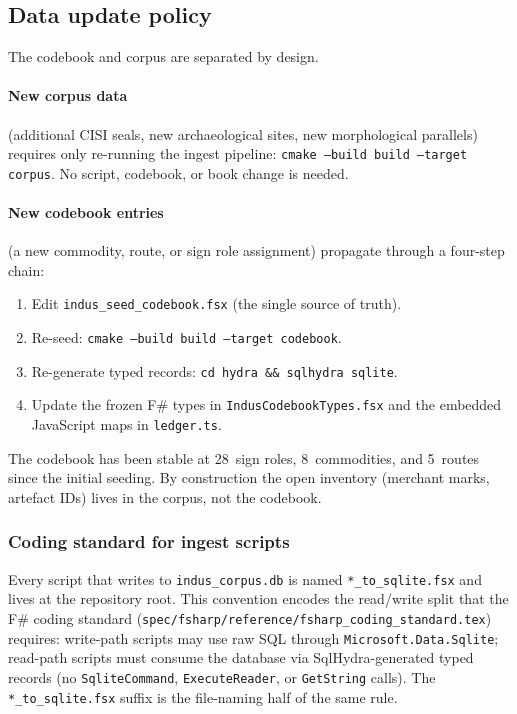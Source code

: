 \subsection{Data update policy}

The codebook and corpus are separated by design.

\paragraph{New corpus data} (additional CISI seals, new
archaeological sites, new morphological parallels) requires only
re-running the ingest pipeline:
\texttt{cmake --build build --target corpus}.
No script, codebook, or book change is needed.

\paragraph{New codebook entries} (a new commodity, route, or sign
role assignment) propagate through a four-step chain:
\begin{enumerate}[nosep]
\item Edit \texttt{indus\_seed\_codebook.fsx} (the single source
  of truth).
\item Re-seed: \texttt{cmake --build build --target codebook}.
\item Re-generate typed records: \texttt{cd hydra \&\& sqlhydra
  sqlite}.
\item Update the frozen F\# types in
  \texttt{IndusCodebookTypes.fsx} and the embedded JavaScript maps
  in \texttt{ledger.ts}.
\end{enumerate}
The codebook has been stable at 28~sign roles, 8~commodities, and
5~routes since the initial seeding. By construction the open
inventory (merchant marks, artefact IDs) lives in the corpus, not
the codebook.

\subsubsection*{Coding standard for ingest scripts}

Every script that writes to \texttt{indus\_corpus.db} is named
\texttt{*\_to\_sqlite.fsx} and lives at the repository root. This
convention encodes the read/write split that the F\# coding
standard (\texttt{spec/fsharp/reference/fsharp\_coding\_standard.tex})
requires: write-path scripts may use raw SQL through
\texttt{Microsoft.Data.Sqlite}; read-path scripts must consume the
database via SqlHydra-generated typed records (no
\texttt{SqliteCommand}, \texttt{ExecuteReader}, or
\texttt{GetString} calls). The \texttt{*\_to\_sqlite.fsx} suffix is
the file-naming half of the same rule.

